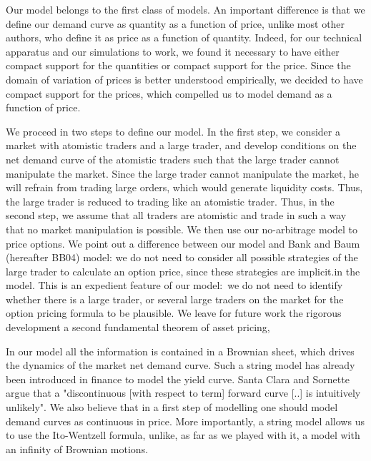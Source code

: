 \documentclass{article}
\begin{document}
Our model belongs to the first class of models. An important difference is
that we define our demand curve as quantity as a function of price, unlike
most other authors, who define it as price as a function of quantity.
Indeed, for our technical apparatus and our simulations to work, we found it
necessary to have either compact support for the quantities or compact
support for the price. Since the domain of variation of prices is better
understood empirically, we decided to have compact support for the prices,
which compelled us to model demand as a function of price.

We proceed in two steps to define our model. In the first step, we consider
a market with atomistic traders and a large trader, and develop conditions
on the net demand curve of the atomistic traders such that the large trader
cannot manipulate the market. Since the large trader cannot manipulate the
market, he will refrain from trading large orders, which would generate
liquidity costs. Thus, the large trader is reduced to trading like an
atomistic trader. Thus, in the second step, we assume that all traders are
atomistic and trade in such a way that no market manipulation is possible.
We then use our no-arbitrage model to price options. We point out a
difference between our model and Bank and Baum (hereafter BB04) model: we do not need to consider
all possible strategies of the large trader to calculate an option price,
since these strategies are implicit.in the model. This is an expedient
feature of our model:\ we do not need to identify whether there is a large
trader, or several large traders on the market for the option pricing
formula to be plausible. We leave for future work the rigorous development a
second fundamental theorem of asset pricing,

In our model all the information is contained in a Brownian sheet, which
drives the dynamics of the market net demand curve. Such a string model has
already been introduced in finance to model the yield curve. Santa Clara and
Sornette \cite{SCS01} argue that a "discontinuous [with respect to term] forward curve
[..] is intuitively unlikely". We also believe that in a first step of
modelling one should model demand curves as continuous in price. More
importantly, a string model allows us to use the Ito-Wentzell formula,
unlike, as far as we played with it, a model with an infinity of Brownian
motions.
\end{document}
